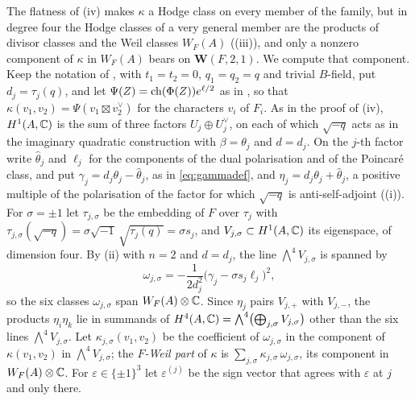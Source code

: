 The flatness of (iv) makes $\kappa$ a Hodge class on
every member of the family, but in degree four the Hodge classes of a very
general member are the products of divisor classes and the Weil classes
$W_{F}(A)$ ((iii)), and only a nonzero component of
$\kappa$ in $W_{F}(A)$ bears on $\mathbf{W}(F,2,1)$. We compute that
component. Keep the notation of , with $t_{1}=t_{2}=0$,
$q_{1}=q_{2}=q$ and trivial $B$-field, put $d_{j}=\tau_{j}(q)$, and let
$\Psi(Z)=\operatorname{ch}(\Phi(Z))e^{\ell/2}$ as in , so that
$\kappa(v_{1},v_{2})=\Psi(v_{1}\boxtimes v_{2}^{\vee})$ for the characters
$v_{i}$ of $F_{i}$. As in the proof of (iv),
$H^{1}(A,\mathbb{C})$ is the sum of three factors $U_{j}\oplus U_{j}^{\vee}$, on each
of which $\sqrt{-q}$ acts as in the imaginary quadratic construction with
$\beta=\theta_{j}$ and $d=d_{j}$. On the $j$-th factor write
$\widehat\theta_{j}$ and $\ell_{j}$ for the components of the dual
polarisation and of the Poincar\'e class, and put
$\gamma_{j}=d_{j}\theta_{j}-\widehat\theta_{j}$, as in \eqref{eq:gammadef},
and $\eta_{j}=d_{j}\theta_{j}+\widehat\theta_{j}$, a positive multiple of the
polarisation of the factor for which $\sqrt{-q}$ is anti-self-adjoint
((i)). For $\sigma=\pm1$ let $\tau_{j,\sigma}$ be the
embedding of $F$ over $\tau_{j}$ with
$\tau_{j,\sigma}(\sqrt{-q})=\sigma\sqrt{-1}\,\sqrt{\tau_{j}(q)}=\sigma s_{j}$,
and $V_{j,\sigma}\subset H^{1}(A,\mathbb{C})$ its eigenspace, of dimension four. By
(ii) with $n=2$ and $d=d_{j}$, the line
$\bigwedge^{4}V_{j,\sigma}$ is spanned by
\begin{equation}\label{eq:sexticomega}
  \omega_{j,\sigma}=-\frac{1}{2d_{j}^{2}}\bigl(\gamma_{j}-\sigma s_{j}\ell_{j}\bigr)^{2},
\end{equation}
so the six classes $\omega_{j,\sigma}$ span $W_{F}(A)\otimes\mathbb{C}$. Since
$\eta_{j}$ pairs $V_{j,+}$ with $V_{j,-}$, the products $\eta_{i}\eta_{k}$ lie
in summands of $H^{4}(A,\mathbb{C})=\bigwedge^{4}\bigl(\bigoplus_{j,\sigma}
V_{j,\sigma}\bigr)$ other than the six lines $\bigwedge^{4}V_{j,\sigma}$. Let
$\kappa_{j,\sigma}(v_{1},v_{2})$ be the coefficient of $\omega_{j,\sigma}$ in
the component of $\kappa(v_{1},v_{2})$ in $\bigwedge^{4}V_{j,\sigma}$; the
\emph{$F$-Weil part} of $\kappa$ is
$\sum_{j,\sigma}\kappa_{j,\sigma}\,\omega_{j,\sigma}$, its component in
$W_{F}(A)\otimes\mathbb{C}$. For $\varepsilon\in\{\pm1\}^{3}$ let
$\varepsilon^{(j)}$ be the sign vector that agrees with $\varepsilon$ at $j$
and only there.


